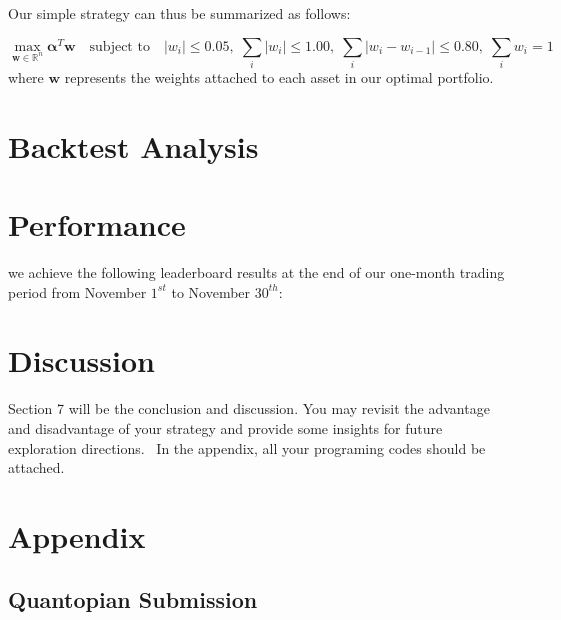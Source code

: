 \documentclass[11,]{article}
\begin{document}
Our simple strategy can thus be summarized as follows:

\[
\max_{{\bm{w}} \in \mathbb{R}^n} {\bm{\alpha}}^T {\bm{w}} \quad \text{subject to} \quad |w_i| \leq 0.05,\; \sum_i |w_i| \leq  1.00, \; \sum_i |w_i-w_{i-1}| \leq 0.80, \; \sum_i w_i = 1
\] \noindent where \({\bm{w}}\) represents the weights attached to each
asset in our optimal portfolio.

\hypertarget{backtest-analysis}{%
\section{Backtest Analysis}\label{backtest-analysis}}

\hypertarget{performance}{%
\section{Performance}\label{performance}}

we achieve the following leaderboard results at the end of our one-month
trading period from November \(1^{st}\) to November \(30^{th}\):

\hypertarget{discussion}{%
\section{Discussion}\label{discussion}}

Section 7 will be the conclusion and discussion. You may revisit the
advantage and disadvantage of your strategy and provide some insights
for future exploration directions.~ In the appendix, all your programing
codes should be attached.~

\hypertarget{appendix}{%
\section{Appendix}\label{appendix}}

\hypertarget{quantopian-submission}{%
\subsection{Quantopian Submission}\label{quantopian-submission}}
\end{document}
